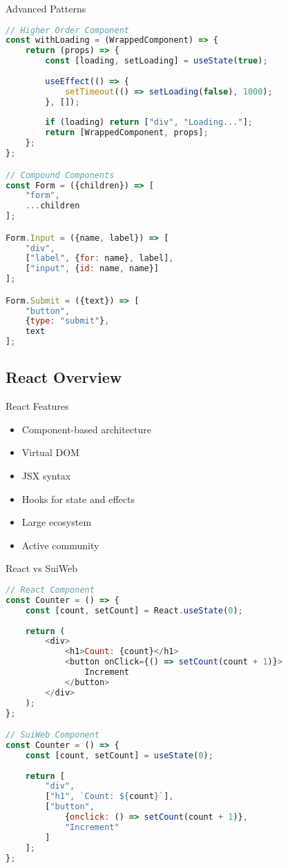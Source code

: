 \begin{KR}{Advanced Patterns}
\begin{lstlisting}[language=JavaScript, style=basesmol]
// Higher Order Component
const withLoading = (WrappedComponent) => {
    return (props) => {
        const [loading, setLoading] = useState(true);
        
        useEffect(() => {
            setTimeout(() => setLoading(false), 1000);
        }, []);
        
        if (loading) return ["div", "Loading..."];
        return [WrappedComponent, props];
    };
};

// Compound Components
const Form = ({children}) => [
    "form",
    ...children
];

Form.Input = ({name, label}) => [
    "div",
    ["label", {for: name}, label],
    ["input", {id: name, name}]
];

Form.Submit = ({text}) => [
    "button", 
    {type: "submit"},
    text
];
\end{lstlisting}
\end{KR}

\subsection{React Overview}

\begin{definition}{React Features}
    \begin{itemize}
        \item Component-based architecture
        \item Virtual DOM
        \item JSX syntax
        \item Hooks for state and effects
        \item Large ecosystem
        \item Active community
    \end{itemize}
\end{definition}

\begin{KR}{React vs SuiWeb}
\begin{lstlisting}[language=JavaScript, style=basesmol]
// React Component
const Counter = () => {
    const [count, setCount] = React.useState(0);
    
    return (
        <div>
            <h1>Count: {count}</h1>
            <button onClick={() => setCount(count + 1)}>
                Increment
            </button>
        </div>
    );
};

// SuiWeb Component
const Counter = () => {
    const [count, setCount] = useState(0);
    
    return [
        "div",
        ["h1", `Count: ${count}`],
        ["button", 
            {onclick: () => setCount(count + 1)},
            "Increment"
        ]
    ];
};
\end{lstlisting}
\end{KR}